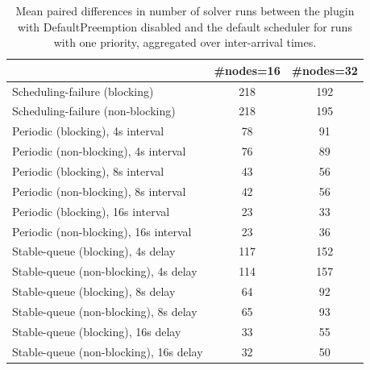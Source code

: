 \begin{table}[t]
\tiny
\setlength{\tabcolsep}{1.2pt}
\renewcommand{\arraystretch}{1.12}
\centering
\caption{Mean paired differences in number of solver runs between the plugin with DefaultPreemption disabled and the default scheduler for runs with one priority, aggregated over inter-arrival times.}
\label{tab:solver_runs-defpreempt0-prio1-std0-agg-arrival}
\begin{tabular}{l c c}
\toprule
 & \#nodes=16 & \#nodes=32 \\
\midrule
Scheduling-failure (blocking) & 218 & 192 \\
Scheduling-failure (non-blocking) & 218 & 195 \\
Periodic (blocking), 4s interval & 78 & 91 \\
Periodic (non-blocking), 4s interval & 76 & 89 \\
Periodic (blocking), 8s interval & 43 & 56 \\
Periodic (non-blocking), 8s interval & 42 & 56 \\
Periodic (blocking), 16s interval & 23 & 33 \\
Periodic (non-blocking), 16s interval & 23 & 36 \\
Stable-queue (blocking), 4s delay & 117 & 152 \\
Stable-queue (non-blocking), 4s delay & 114 & 157 \\
Stable-queue (blocking), 8s delay & 64 & 92 \\
Stable-queue (non-blocking), 8s delay & 65 & 93 \\
Stable-queue (blocking), 16s delay & 33 & 55 \\
Stable-queue (non-blocking), 16s delay & 32 & 50 \\
\bottomrule
\end{tabular}
\end{table}
